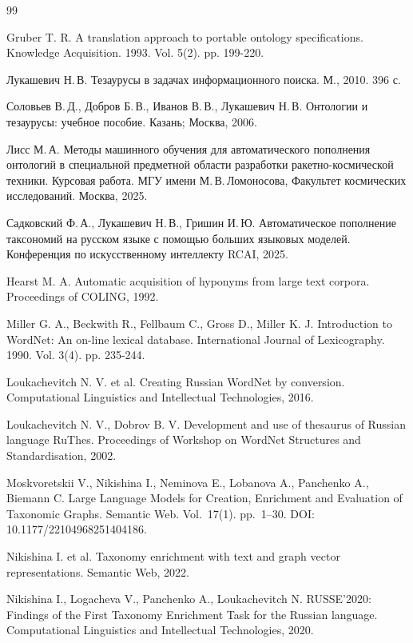\documentclass[12pt,a4paper,oneside,openany]{report}
\begin{document}
\begin{thebibliography}{99}

Gruber T. R.
A translation approach to portable ontology specifications.
Knowledge Acquisition. 1993. Vol. 5(2). pp. 199-220.

Лукашевич Н.\,В.
Тезаурусы в задачах информационного поиска.
М., 2010. 396 с.

Соловьев В.\,Д., Добров Б.\,В., Иванов В.\,В., Лукашевич Н.\,В.
Онтологии и тезаурусы: учебное пособие.
Казань; Москва, 2006.

Лисс М.\,А.
Методы машинного обучения для автоматического пополнения онтологий в специальной предметной области разработки ракетно-космической техники.
Курсовая работа. МГУ имени М.\,В.\,Ломоносова, Факультет космических исследований. Москва, 2025.

Садковский Ф.\,А., Лукашевич Н.\,В., Гришин И.\,Ю.
Автоматическое пополнение таксономий на русском языке с помощью больших языковых моделей.
Конференция по искусственному интеллекту RCAI, 2025.

Hearst M. A.
Automatic acquisition of hyponyms from large text corpora.
Proceedings of COLING, 1992.

Miller G. A., Beckwith R., Fellbaum C., Gross D., Miller K. J.
Introduction to WordNet: An on-line lexical database.
International Journal of Lexicography. 1990. Vol. 3(4). pp. 235-244.

Loukachevitch N. V. et al.
Creating Russian WordNet by conversion.
Computational Linguistics and Intellectual Technologies, 2016.

Loukachevitch N. V., Dobrov B. V.
Development and use of thesaurus of Russian language RuThes.
Proceedings of Workshop on WordNet Structures and Standardisation, 2002.

Moskvoretskii V., Nikishina I., Neminova E., Lobanova A., Panchenko A., Biemann C.
Large Language Models for Creation, Enrichment and Evaluation of Taxonomic Graphs.
Semantic Web. Vol.~17(1). pp.~1--30.
DOI: 10.1177/22104968251404186.

Nikishina I. et al.
Taxonomy enrichment with text and graph vector representations.
Semantic Web, 2022.

Nikishina I., Logacheva V., Panchenko A., Loukachevitch N.
RUSSE'2020: Findings of the First Taxonomy Enrichment Task for the Russian language.
Computational Linguistics and Intellectual Technologies, 2020.


\end{thebibliography}
\end{document}
